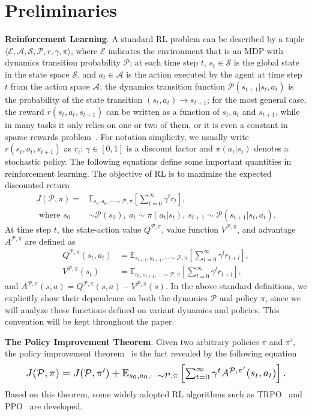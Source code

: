 \documentclass[letterpaper]{article} %
\def\E{{\mathbb{E}}}
\def\P{{\mathcal{P}}}
\def\A{{\mathcal{A}}}
\def\S{{\mathcal{S}}}
\begin{document}
\section{Preliminaries}
\textbf{Reinforcement Learning}.
A standard RL problem can be described by a tuple $\langle \mathcal{E}, \A, \S, \P, r, \gamma, \pi \rangle$, where $\mathcal{E}$ indicates the environment that is an MDP with dynamics transition probability $\P$; at each time step $t$, $s_t\in\S$ is the global state in the state space $\S$, and $a_t\in\A$ is the action executed by the agent at time step $t$ from the action space $\A$; the dynamics transition function $\P(s_{t+1}|s_t,a_t)$ is the probability of the state transition $(s_t,a_t)\xrightarrow{}s_{t+1}$; for the most general case, the reward $r(s_t,a_t,s_{t+1})$ can be written as a function of $s_t,a_t$ and $s_{t+1}$, while in many tasks it only relies on one or two of them, or it is even a constant in sparse rewards problem~\citep{xu2023efficient}. For notation simplicity, we usually write $r(s_t,a_t,s_{t+1})$ as $r_t$; $\gamma\in[0,1]$ is a discount factor and $\pi(a_t|s_t)$ denotes a stochastic policy. The following equations define some important quantities in reinforcement learning.
The objective of RL is to maximize the expected discounted return
\begin{align}
J(\P,\pi)= & \mathbb{E}_{s_0,a_0,\cdots\sim\P,\pi}
\left[ \sum_{t=0}^{\infty}\gamma^t r_t \right], \\
\text{ where } s_0&\sim\P(s_0),\
a_t\sim\pi(a_t|s_t),\ s_{t+1}\sim\P(s_{t+1}|s_t,a_t). \nonumber
\end{align}
At time step $t$, the state-action value $Q^{\P,\pi}$, value function $V^{\P,\pi}$, and advantage $A^{\P,\pi}$ are defined as
\begin{align}
Q^{\P,\pi}(s_t,a_t)&=\E_{s_{t+1},a_{t+1},\cdots\sim\P,\pi}
\left[
\sum_{l=0}^{\infty}\gamma^l r_{t+l}
\right], \\
V^{\P,\pi}(s_t)&=\E_{a_{t},s_{t+1},\cdots\sim\P,\pi}
\left[
\sum_{l=0}^{\infty}\gamma^l r_{t+l}
\right],
\end{align}
and $A^{\P,\pi}(s,a)=Q^{\P,\pi}(s,a)-V^{\P,\pi}(s)$.
In the above standard definitions, we explicitly show their dependence on both the dynamics $\P$ and policy $\pi$, since we will analyze these functions defined on variant dynamics and policies. This convention will be kept throughout the paper.

\textbf{The Policy Improvement Theorem}.
Given two arbitrary policies $\pi$ and $\pi'$, the policy improvement theorem~\citep{kakade2002,schulman2015trust} is the fact revealed by the following equation
\begin{equation}
\resizebox{.9\hsize}{!}{$
J(\P,\pi)=J(\P,\pi')+\E_{s_0,a_0,\cdots\sim\P,\pi}
\left[
\sum_{t=0}^\infty\gamma^t A^{\P,\pi'}(s_t,a_t)
\right].
$}
\label{eq:pit}
\end{equation}
Based on this theorem, some widely adopted RL algorithms such as TRPO~\citep{schulman2015trust} and PPO~\citep{schulman2017proximal} are developed.
\end{document}
